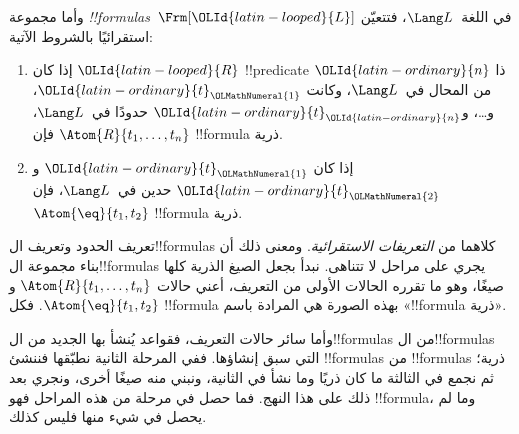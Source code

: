 \documentclass[../../../include/open-logic-section]{subfiles}
\begin{document}
\begin{defn}[الصيغ]
وأما مجموعة \emph{!!{formula}s}~$\Frm[\OLId{latin-looped}{L}]$ في اللغة~$\Lang L$،
فتتعيّن استقرائيًا بالشروط الآتية:
\begin{enumerate}


\item إذا كان $\OLId{latin-looped}{R}$ !!{predicate} ذا $\OLId{latin-ordinary}{n}$ من المحال في~$\Lang L$، وكانت
  $\OLId{latin-ordinary}{t}_\OLMathNumeral{1}$، و\dots، و$\OLId{latin-ordinary}{t}_\OLId{latin-ordinary}{n}$ حدودًا في~$\Lang L$، فإن
  $\Atom{R}{t_1,\ldots, t_n}$ !!{formula} ذرية.

\item إذا كان $\OLId{latin-ordinary}{t}_\OLMathNumeral{1}$ و$\OLId{latin-ordinary}{t}_\OLMathNumeral{2}$ حدين في~$\Lang L$، فإن
  $\Atom{\eq}{t_1, t_2}$ !!{formula} ذرية.








\end{enumerate}
\end{defn}

\begin{explain}
تعريف الحدود وتعريف ال!!{formula}s كلاهما من
\emph{التعريفات الاستقرائية}. ومعنى ذلك أن بناء مجموعة
ال!!{formula}s يجري على مراحل لا تتناهى. نبدأ بجعل الصيغ الذرية
كلها صيغًا، وهو ما تقرره الحالات الأولى من التعريف، أعني حالات
%
%
$\Atom{R}{t_1,\dots,t_n}$ و$\Atom{\eq}{t_1,t_2}$. فكل
!!{formula} بهذه الصورة هي المرادة باسم «!!{formula} ذرية».

وأما سائر حالات التعريف، فقواعد يُنشأ بها الجديد من ال!!{formula}s
من ال!!{formula}s التي سبق إنشاؤها. ففي المرحلة الثانية نطبّقها
فننشئ !!{formula}s من !!{formula}s ذرية؛ ثم نجمع في الثالثة ما
كان ذريًا وما نشأ في الثانية، ونبني منه صيغًا أخرى، ونجري بعد ذلك
على هذا النهج. فما حصل في مرحلة من هذه المراحل فهو !!{formula}،
وما لم يحصل في شيء منها فليس كذلك.
\end{explain}
\end{document}
